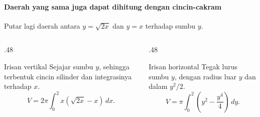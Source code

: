 \documentclass{../../kalkulus-ppt}
\begin{document}
\begin{frame}{\insertsection}
    \framesubtitle{Daerah yang sama juga dapat dihitung dengan cincin-cakram}
    Putar lagi daerah antara $y=\sqrt{2x}$ dan $y=x$ terhadap sumbu $y$.
    \begin{columns}[t,onlytextwidth]
        \begin{column}{.48\textwidth}
            \begin{block}{Irisan vertikal}
                Sejajar sumbu $y$, sehingga terbentuk cincin silinder
                dan integrasinya terhadap $x$.
                \[
                    V=2\pi\int_0^2 x(\sqrt{2x}-x)\,dx.
                \]
            \end{block}
        \end{column}
        \begin{column}{.48\textwidth}
            \begin{block}{Irisan horizontal}
                Tegak lurus sumbu $y$, dengan radius luar $y$
                dan dalam $y^2/2$.
                \[
                    V=\pi\int_0^2\left(y^2-\frac{y^4}{4}\right)\,dy.
                \]
            \end{block}
        \end{column}
    \end{columns}
\end{frame}
\end{document}
